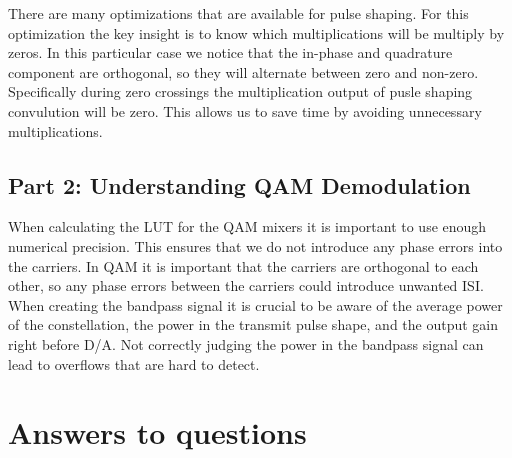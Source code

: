 \documentclass{article}
\begin{document}
There are many optimizations that are available for pulse shaping.
For this optimization the key insight is to know which multiplications will be multiply by zeros. 
In this particular case we notice that the in-phase and quadrature component are orthogonal,
so they will alternate between zero and non-zero.
Specifically during zero crossings the multiplication output of pusle shaping convulution will be zero.
This allows us to save time by avoiding unnecessary multiplications.

\subsection{Part 2: Understanding QAM Demodulation}
When calculating the LUT for the QAM mixers it is important to use enough numerical precision.
This ensures that we do not introduce any phase errors into the carriers.
In QAM it is important that the carriers are orthogonal to each other, so any phase errors between
the carriers could introduce unwanted ISI.\\

When creating the bandpass signal it is crucial to be aware of the average power of the constellation,
the power in the transmit pulse shape, and the output gain right before D/A.
Not correctly judging the power in the bandpass signal can lead to overflows that are hard to detect.


\section{Answers to questions}
\end{document}
